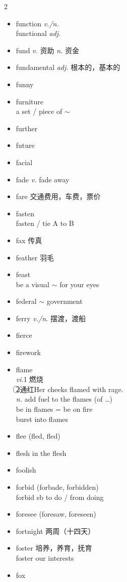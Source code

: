 \documentclass[../../book.tex]{subfiles}
\begin{document}
\begin{multicols}{2}
\begin{itemize}
\item[-] function \emph{v./n.}
\\functional \emph{adj.}
\item[-] fund \emph{v.} 资助 \emph{n.} 资金
\item[-] fundamental \emph{adj.} 根本的，基本的
\item[-] funny
\item[-] furniture
\\a set / piece of $\sim$
\item[-] further
\item[-] future
\item[-] facial
\item[-] fade \emph{v.} fade away
\item[-] fare 交通费用，车费，票价
\item[-] fasten
\\fasten / tie A to B
\item[-] fax 传真
\item[-] feather 羽毛
\item[-] feast
\\be a visual $\sim$ for your eyes
\item[-] federal \phantom{a} $\sim$ government
\item[-] ferry \emph{v./n.} 摆渡，渡船
\item[-] fierce
\item[-] firework
\item[-] flame
\\\emph{vi.}\textcircled{1}燃烧\\\textcircled{2}通红{\small Her cheeks flamed with rage.}
\\\emph{n.} add fuel to the flames (of \ldots)
\\ be in flames = be on fire
\\ burst into flames
\item[-] flee (fled, fled)
\item[-] flesh \phantom{a} in the flesh
\item[-] foolish
\item[-] forbid (forbade, forbidden)
\\forbid sb to do / from doing
\item[-] foresee (foresaw, foreseen)
\item[-] fortnight 两周（十四天）
\item[-] foster 培养，养育，抚育
\\foster our interests
\item[-] fox

\end{itemize}
\end{multicols}
\end{document}
